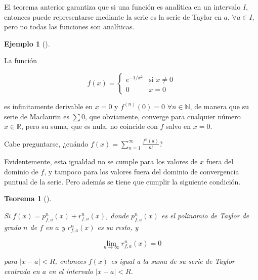 \documentclass[
  a4paper,
]{scrreport}
\theoremstyle{plain}
\theoremstyle{plain}
\newtheorem{theorem}{Teorema}[chapter]
\theoremstyle{definition}
\theoremstyle{plain}
\theoremstyle{definition}
\newtheorem{example}{Ejemplo}[chapter]
\theoremstyle{remark}
\begin{document}
\begin{tcolorbox}[enhanced jigsaw, title=\textcolor{quarto-callout-warning-color}{\faExclamationTriangle}\hspace{0.5em}{Advertencia}, opacityback=0, titlerule=0mm, colback=white, opacitybacktitle=0.6, colbacktitle=quarto-callout-warning-color!10!white, breakable, left=2mm, bottomtitle=1mm, toptitle=1mm, coltitle=black, arc=.35mm, leftrule=.75mm, toprule=.15mm, rightrule=.15mm, bottomrule=.15mm, colframe=quarto-callout-warning-color-frame]

El teorema anterior garantiza que si una función es analítica en un
intervalo \(I\), entonces puede representarse mediante la serie es la
serie de Taylor en \(a\), \(\forall a\in I\), pero no todas las
funciones son analíticas.

\end{tcolorbox}

\leavevmode{}%
\begin{example}[]\label{exm-funcion-no-coincidente-serie-taylor}

La función

\[
f(x) =
\begin{cases}
e^{-1/x^2} & \mbox{si $x\neq 0$}\\
0 & \mbox{$x=0$}
\end{cases}
\]

es infinitamente derivable en \(x=0\) y \(f^{(n)}(0)=0\)
\(\forall n\in\mathbb{N}\), de manera que su serie de Maclaurin es
\(\sum 0\), que obviamente, converge para cualquier número
\(x\in\mathbb{R}\), pero su suma, que es nula, no coincide con \(f\)
salvo en \(x=0\).

\end{example}

Cabe preguntarse, ¿cuándo
\(f(x)=\sum_{n=1}^\infty \frac{f^{n}(a)}{n!}\)?

Evidentemente, esta igualdad no se cumple para los valores de \(x\)
fuera del dominio de \(f\), y tampoco para los valores fuera del dominio
de convergencia puntual de la serie. Pero además se tiene que cumplir la
siguiente condición.

\leavevmode{}%
\begin{theorem}[]\label{thm-condicion-serie-taylor}

Si \(f(x)=p_{f,a}^n(x) + r_{f,a}^n(x)\), donde \(p_{f,a}^n(x)\) es el
polinomio de Taylor de grado \(n\) de \(f\) en \(a\) y \(r_{f,a}^n(x)\)
es su resto, y

\[
\lim_{n\to\infty} r_{f,a}^n(x) = 0
\]

para \(|x-a|<R\), entonces \(f(x)\) es igual a la suma de su serie de
Taylor centrada en \(a\) en el intervalo \(|x-a|<R\).

\end{theorem}
\end{document}
